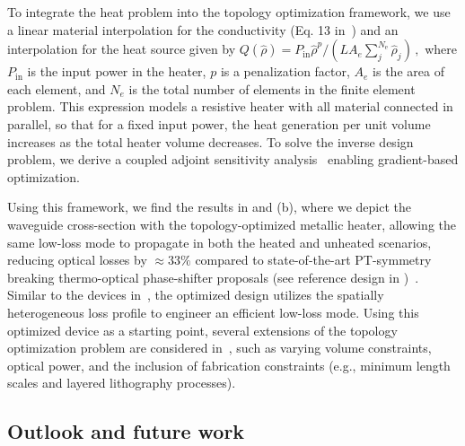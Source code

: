  To integrate the heat problem into the 
 topology optimization framework, we use a linear material interpolation 
for the conductivity (Eq. 13 in~\cite{ownpub0}) and an interpolation for the heat source given by $
 Q(\hat{\rho})=P_{\text{in}} \hat{\rho}^p / \left( L A_e \sum^{N_\text{e}}_j \hat{\rho}_j \right)\,,
$
where $P_\text{in}$ is the input power in the heater, $p$ is a penalization factor, $A_e$ is the area of each element, and 
$N_e$ is the total number of elements in the finite element problem. 
This expression models a resistive heater with all material connected in parallel, so that for a fixed input power, the heat 
generation per unit volume increases as the total heater volume decreases.
To solve the inverse design
problem, we derive a coupled adjoint sensitivity analysis~\cite{ownpub0} enabling gradient-based optimization.

Using this framework, we find the results in  and  (b), where we depict the waveguide cross-section with the topology-optimized metallic heater,
allowing the same low-loss mode to propagate in both the heated and unheated scenarios,
reducing optical losses by $\approx 33 \%$ compared to state-of-the-art PT-symmetry breaking thermo-optical phase-shifter proposals (see reference design in )~\cite{lipson}. Similar to the devices
in~\cite{lipson}, the optimized design utilizes the spatially heterogeneous loss profile to engineer an efficient low-loss mode. Using this optimized device as a starting point, several extensions of the topology optimization problem are considered in~\cite{ownpub0}, such as varying volume constraints, optical power, and the inclusion of fabrication constraints (e.g., minimum length scales and layered 
lithography processes).

\subsection*{Outlook and future work}

